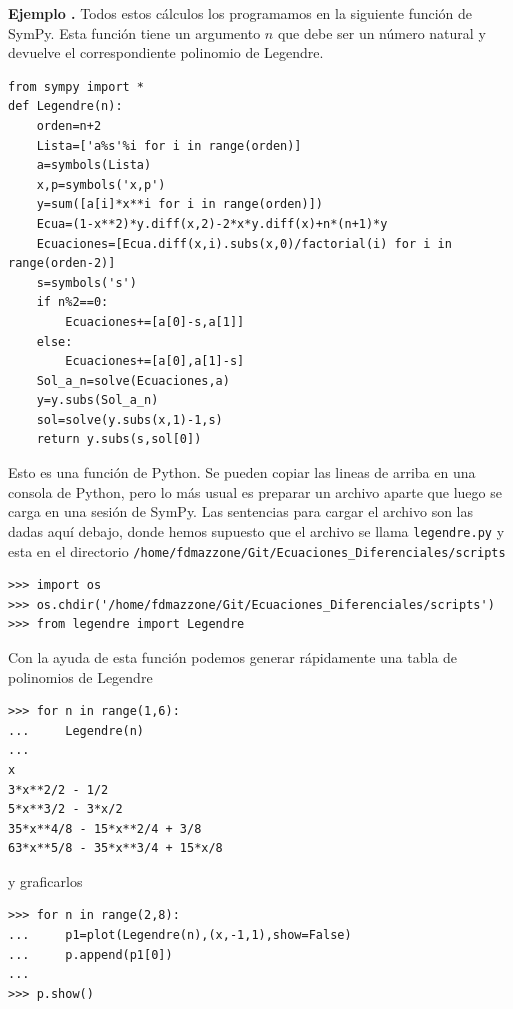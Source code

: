 \documentclass{article}
\newcounter{cor_cont}
\newcounter{ejem_cont}
\newenvironment{ejemplo}[1]{\refstepcounter{ejem_cont}\vspace{1ex}\noindent\textbf{Ejemplo \arabic{ejem_cont}.} #1}{}
\begin{document}
\begin{ejemplo}
Todos estos cálculos los programamos en la siguiente función de SymPy. Esta función tiene un argumento $n$ que debe ser un número natural y devuelve el correspondiente polinomio de Legendre.


\begin{lstlisting}
from sympy import *
def Legendre(n):
    orden=n+2
    Lista=['a%s'%i for i in range(orden)]
    a=symbols(Lista)
    x,p=symbols('x,p')
    y=sum([a[i]*x**i for i in range(orden)])
    Ecua=(1-x**2)*y.diff(x,2)-2*x*y.diff(x)+n*(n+1)*y
    Ecuaciones=[Ecua.diff(x,i).subs(x,0)/factorial(i) for i in range(orden-2)]       
    s=symbols('s')
    if n%2==0:
        Ecuaciones+=[a[0]-s,a[1]]
    else:
        Ecuaciones+=[a[0],a[1]-s]
    Sol_a_n=solve(Ecuaciones,a)
    y=y.subs(Sol_a_n)
    sol=solve(y.subs(x,1)-1,s)
    return y.subs(s,sol[0])
\end{lstlisting}

Esto es una función de Python. Se pueden copiar las lineas de arriba en una consola de Python, pero lo más usual es preparar un archivo aparte que luego se carga en una sesión de SymPy.  Las sentencias para cargar el archivo son las dadas aquí debajo, donde hemos supuesto que el archivo se llama \texttt{legendre.py} y esta en el directorio \texttt{/home/fdmazzone/Git/Ecuaciones\_Diferenciales/scripts}

\begin{lstlisting}
>>> import os
>>> os.chdir('/home/fdmazzone/Git/Ecuaciones_Diferenciales/scripts')
>>> from legendre import Legendre
\end{lstlisting}


Con la ayuda de esta función podemos generar rápidamente una tabla de polinomios de Legendre
\begin{lstlisting}
>>> for n in range(1,6):
...     Legendre(n)
... 
x
3*x**2/2 - 1/2
5*x**3/2 - 3*x/2
35*x**4/8 - 15*x**2/4 + 3/8
63*x**5/8 - 35*x**3/4 + 15*x/8
\end{lstlisting}
y graficarlos
\begin{lstlisting}
>>> for n in range(2,8):
...     p1=plot(Legendre(n),(x,-1,1),show=False)
...     p.append(p1[0])
... 
>>> p.show()
\end{lstlisting}



\end{ejemplo}
\end{document}
